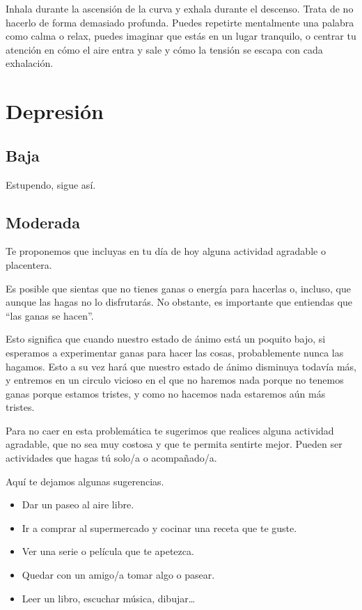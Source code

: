             Inhala durante la ascensión de la curva y exhala durante el descenso. Trata de no hacerlo de forma demasiado profunda. Puedes repetirte mentalmente una palabra como calma o relax, puedes imaginar que estás en un lugar tranquilo, o centrar tu atención en cómo el aire entra y sale y cómo la tensión se escapa con cada exhalación. 
    
    \section{Depresión}
        \subsection{Baja}
            Estupendo, sigue así. 
        \subsection{Moderada}

            Te proponemos que incluyas en tu  día de hoy alguna actividad agradable o placentera. 
            
            Es posible que sientas que no tienes ganas o energía para hacerlas o, incluso, que aunque las hagas no lo disfrutarás. No obstante, es importante que entiendas que “las ganas se hacen”. 
            
            Esto significa que cuando nuestro estado de ánimo está un poquito bajo, si esperamos a experimentar ganas para hacer las cosas, probablemente nunca las hagamos. Esto a su vez hará que nuestro estado de ánimo disminuya todavía más, y entremos en un circulo vicioso en el que no haremos nada porque no tenemos ganas porque estamos tristes, y como no hacemos nada estaremos aún más tristes. 
            
            Para no caer en esta problemática te sugerimos que realices alguna actividad agradable, que no sea muy costosa y que te permita sentirte mejor. Pueden ser actividades que hagas tú solo/a o acompañado/a. 
            
            Aquí te dejamos algunas sugerencias. 
            \begin{itemize}
                \item Dar un paseo al aire libre. 
                \item Ir a comprar al supermercado y cocinar una receta que te guste. 
                \item Ver una serie o película que te apetezca.
                \item Quedar con un amigo/a tomar algo o pasear.
                \item Leer un libro, escuchar música, dibujar… 
            \end{itemize}

